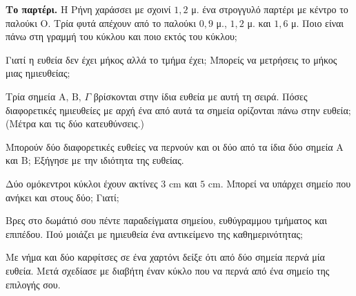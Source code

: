 \ex \textbf{Το παρτέρι.} Η Ρήνη χαράσσει με σχοινί $1{,}2$ μ. ένα στρογγυλό παρτέρι με κέντρο το παλούκι $\mathrm{Ο}$. Τρία φυτά απέχουν από το παλούκι $0{,}9$ μ., $1{,}2$ μ. και $1{,}6$ μ. Ποιο είναι πάνω στη γραμμή του κύκλου και ποιο εκτός του κύκλου;


\ex Γιατί η ευθεία δεν έχει μήκος αλλά το τμήμα έχει; Μπορείς να μετρήσεις το μήκος μιας ημιευθείας;

\ex Τρία σημεία $\mathrm{Α},\,\mathrm{Β},\,\Gamma$ βρίσκονται στην ίδια ευθεία με αυτή τη σειρά. Πόσες διαφορετικές ημιευθείες με αρχή ένα από αυτά τα σημεία ορίζονται πάνω στην ευθεία; (Μέτρα και τις δύο κατευθύνσεις.)

\ex Μπορούν δύο διαφορετικές ευθείες να περνούν και οι δύο από τα ίδια δύο σημεία $\mathrm{Α}$ και $\mathrm{Β}$; Εξήγησε με την ιδιότητα της ευθείας.

\ex Δύο ομόκεντροι κύκλοι έχουν ακτίνες $3$ cm και $5$ cm. Μπορεί να υπάρχει σημείο που ανήκει και στους δύο; Γιατί;


\ex Βρες στο δωμάτιό σου πέντε παραδείγματα σημείου, ευθύγραμμου τμήματος και επιπέδου. Πού μοιάζει με ημιευθεία ένα αντικείμενο της καθημερινότητας;

\ex Με νήμα και δύο καρφίτσες σε ένα χαρτόνι δείξε ότι από δύο σημεία περνά μία ευθεία. Μετά σχεδίασε με διαβήτη έναν κύκλο που να περνά από ένα σημείο της επιλογής σου.
